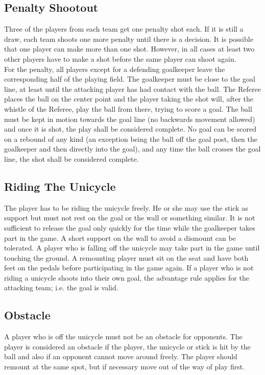 \subsection{Penalty Shootout}
Three of the players from each team get one penalty shot each. If it is still a draw, each team shoots one more penalty
until there is a decision. It is possible that one player can make more than one shot. However, in all cases at least two
other players have to make a shot before the same player can shoot again.\\
For the penalty, all players except for a defending goalkeeper leave the corresponding half of the playing field. The
goalkeeper must be close to the goal line, at least until the attacking player has had contact with the ball. The Referee
places the ball on the center point and the player taking the shot will, after the whistle of the Referee, play the ball from
there, trying to score a goal. The ball must be kept in motion towards the goal line (no backwards movement allowed)
and once it is shot, the play shall be considered complete. No goal can be scored on a rebound of any kind (an
exception being the ball off the goal post, then the goalkeeper and then directly into the goal), and any time the ball
crosses the goal line, the shot shall be considered complete.

\subsection{Riding The Unicycle}
The player has to be riding the unicycle freely. He or she may use the stick as support but must not rest on the goal or
the wall or something similar. It is not sufficient to release the goal only quickly for the time while the goalkeeper takes
part in the game. A short support on the wall to avoid a dismount can be tolerated. A player who is falling off the
unicycle may take part in the game until touching the ground. A remounting player must sit on the seat and have both
feet on the pedals before participating in the game again. If a player who is not riding a unicycle shoots into their own
goal, the advantage rule applies for the attacking team; i.e. the goal is valid.

\subsection{Obstacle}
A player who is off the unicycle must not be an obstacle for opponents. The player is considered an obstacle if the
player, the unicycle or stick is hit by the ball and also if an opponent cannot move around freely. The player should
remount at the same spot, but if necessary move out of the way of play first.

